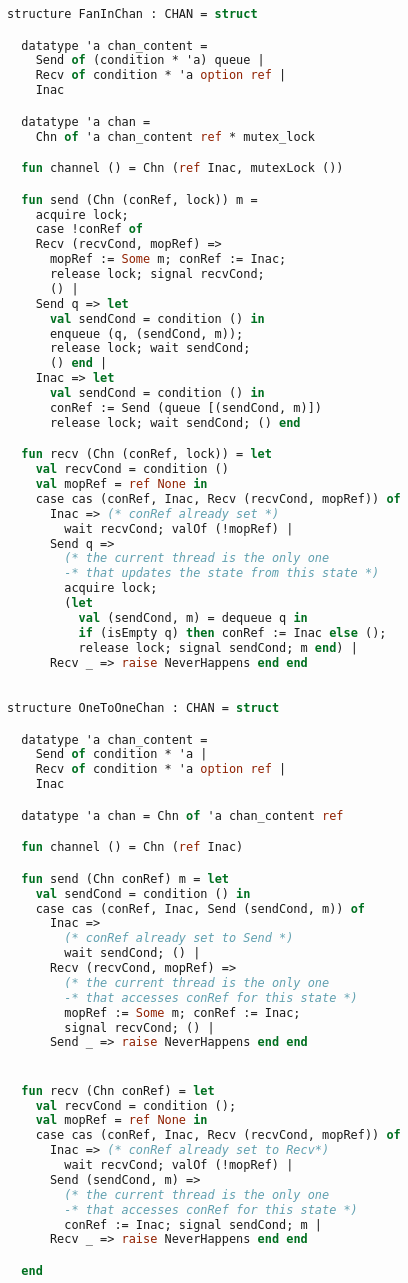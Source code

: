 \documentclass{article}
\begin{document}
\begin{lstlisting}[language=ML, style=codestyle1]
  structure FanInChan : CHAN = struct

  datatype 'a chan_content =
    Send of (condition * 'a) queue |
    Recv of condition * 'a option ref |
    Inac

  datatype 'a chan =
    Chn of 'a chan_content ref * mutex_lock

  fun channel () = Chn (ref Inac, mutexLock ())

  fun send (Chn (conRef, lock)) m = 
    acquire lock;
    case !conRef of
    Recv (recvCond, mopRef) => 
      mopRef := Some m; conRef := Inac;
      release lock; signal recvCond;
      () |
    Send q => let
      val sendCond = condition () in
      enqueue (q, (sendCond, m));
      release lock; wait sendCond;
      () end |
    Inac => let
      val sendCond = condition () in
      conRef := Send (queue [(sendCond, m)])
      release lock; wait sendCond; () end 

  fun recv (Chn (conRef, lock)) = let
    val recvCond = condition () 
    val mopRef = ref None in
    case cas (conRef, Inac, Recv (recvCond, mopRef)) of
      Inac => (* conRef already set *)
        wait recvCond; valOf (!mopRef) |
      Send q =>
        (* the current thread is the only one
        -* that updates the state from this state *)
        acquire lock;
        (let
          val (sendCond, m) = dequeue q in
          if (isEmpty q) then conRef := Inac else (); 
          release lock; signal sendCond; m end) |
      Recv _ => raise NeverHappens end end

  \end{lstlisting}

\begin{lstlisting}[language=ML, style=codestyle1]

structure OneToOneChan : CHAN = struct

  datatype 'a chan_content =
    Send of condition * 'a |
    Recv of condition * 'a option ref |
    Inac  

  datatype 'a chan = Chn of 'a chan_content ref

  fun channel () = Chn (ref Inac)

  fun send (Chn conRef) m = let
    val sendCond = condition () in
    case cas (conRef, Inac, Send (sendCond, m)) of
      Inac => 
        (* conRef already set to Send *)
        wait sendCond; () |
      Recv (recvCond, mopRef) =>
        (* the current thread is the only one
        -* that accesses conRef for this state *)
        mopRef := Some m; conRef := Inac;
        signal recvCond; () |
      Send _ => raise NeverHappens end end


  fun recv (Chn conRef) = let
    val recvCond = condition ();
    val mopRef = ref None in
    case cas (conRef, Inac, Recv (recvCond, mopRef)) of
      Inac => (* conRef already set to Recv*)
        wait recvCond; valOf (!mopRef) |
      Send (sendCond, m) =>
        (* the current thread is the only one
        -* that accesses conRef for this state *)
        conRef := Inac; signal sendCond; m |
      Recv _ => raise NeverHappens end end 

  end
  \end{lstlisting}
\end{document}
